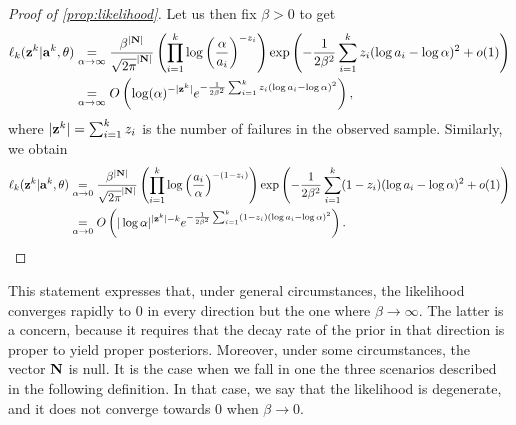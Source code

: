 \begin{proof}[Proof of \cref{prop:likelihood}]
{Let us then fix $\beta>0$ to get
\begin{equation}
    \begin{aligned}
        \ell_k(\mathbf{z}^k|\mathbf{a}^k,\theta) &\overset{}{\underset{\alpha\rightarrow\infty}{=}} \frac{\beta^{|\mathbf{N}|}}{\sqrt{2\pi}^{|\mathbf{N}|}} \left(\prod_{i=1}^k\log\left(\frac\alpha{a_i}\right)^{-z_i}\right) 
        \exp\left({-\frac{1}{2\beta^2}\sum_{i=1}^k z_i(\log a_i-\log\alpha)^2+o(1)}\right)
        \\
            &\overset{}{\underset{\alpha\rightarrow\infty}{=}}O\left(\log(\alpha)^{-|\mathbf{z}^k|} e^{-\frac{1}{2\beta^2}\sum_{i=1}^k z_i(\log a_i-\log\alpha)^2} \right),
    \end{aligned}
\end{equation}
where $|\mathbf{z}^k|=\sum_{i=1}^kz_i$ is the number of failures in the observed sample.
Similarly, we obtain
\begin{equation}
    \begin{aligned}
        \ell_k(\mathbf{z}^k|\mathbf{a}^k,\theta) 
        &\overset{}{\underset{\alpha\rightarrow0}{=}}
            \frac{\beta^{|\mathbf{N}|}}{\sqrt{2\pi}^{|\mathbf{N}|}} \left(\prod_{i=1}^k\log\left(\frac{a_i}\alpha\right)^{-(1-z_i)}\right) 
            \exp\left({-\frac{1}{2\beta^2}\sum_{i=1}^k (1-z_i)(\log a_i-\log\alpha)^2+o(1)}\right)
        \\
            &\overset{}{\underset{\alpha\rightarrow0}{=}}O\left(|\log\alpha|^{|\mathbf{z}^k|-k} e^{-\frac{1}{2\beta^2}\sum_{i=1}^k (1-z_i)(\log a_i-\log\alpha)^2} \right).
    \end{aligned}
\end{equation}
}
\end{proof}


This statement expresses that, under general circumstances, the likelihood converges rapidly to $0$ in every direction but the one where $\beta\to\infty$.
The latter is a concern, because it requires that the decay rate of the prior in that direction is proper to yield proper posteriors.
Moreover, under some circumstances, %
the vector $\mathbf{N}$ is null. It is the case when we fall in one the three scenarios described in the following definition.
In that case, we say that the likelihood is degenerate, and it does not converge towards $0$ when $\beta\to0$. 


